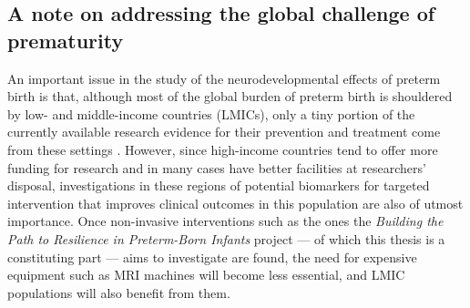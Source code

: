 \subsection*{A note on addressing the global challenge of prematurity} 
An important issue in the study of the neurodevelopmental effects of preterm birth is that, although most of the global burden of preterm birth is shouldered by low- and middle-income countries (LMICs), only a tiny portion of the currently available research evidence for their prevention and treatment come from these settings \citep{Smid2016}. However, since high-income countries tend to offer more funding for research and in many cases have better facilities at researchers' disposal, investigations in these regions of potential biomarkers for targeted intervention that improves clinical outcomes in this population are also of utmost importance. Once non-invasive interventions such as the ones the \textit{Building the Path to Resilience in Preterm-Born Infants} project --- of which this thesis is a constituting part --- aims to investigate are found, the need for expensive equipment such as MRI machines will become less essential, and LMIC populations will also benefit from them.  


\clearpage